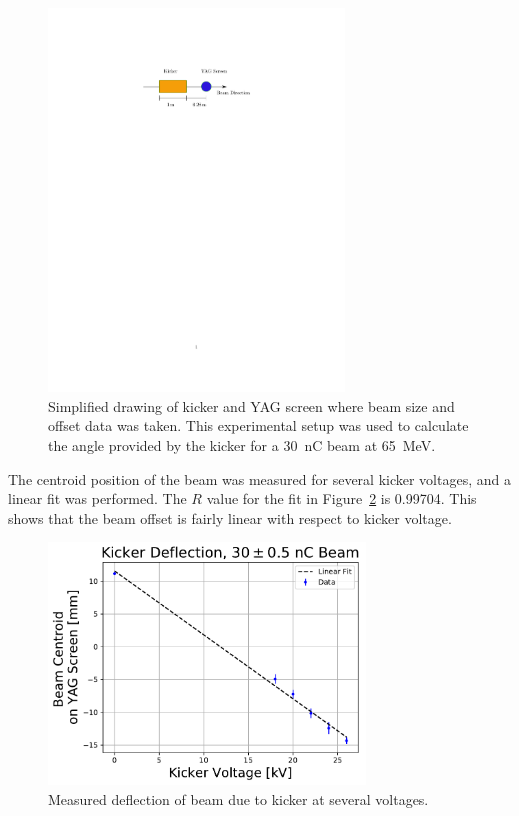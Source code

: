 \documentclass[aps,prab,preprint,groupedaddress,linenumbers]{revtex4-2}
\begin{document}
\begin{figure}
\includegraphics[width=0.7\textwidth]{kicker_yag}
	\caption{Simplified drawing of kicker and YAG screen where beam size and offset data 
		was taken. This experimental setup was used to calculate 
		the angle provided by the kicker for a \SI{30}{nC} beam at \SI{65}{MeV}.}
	\label{fig:kyag}
\end{figure}
The centroid position of the beam was measured for several kicker voltages, and a linear fit was performed.
The $R$ value for the fit in Figure~\ref{fig:linear} is 0.99704. This shows that the beam offset 
is fairly linear with respect to kicker voltage. 
\begin{figure}
	\centering
	\includegraphics[width=0.75\textwidth]{kicker_linearity}
	\caption{Measured deflection of beam due to kicker at several voltages.}
	\label{fig:linear}
\end{figure}
\end{document}
